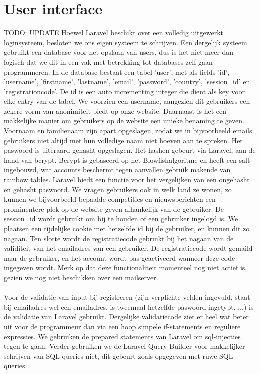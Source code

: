 \documentclass[11pt, a4paper]{article}
\begin{document}
\section{User interface}
TODO: UPDATE
Hoewel Laravel beschikt over een volledig uitgewerkt loginsysteem, besloten we ons eigen systeem te schrijven. Een dergelijk systeem gebruikt een database voor het opslaan van users, dus is het niet meer dan logisch dat we dit in een vak met betrekking tot databases zelf gaan programmeren. In de database bestaat een tabel 'user', met als fields 'id', 'username', 'firstname', 'lastname', 'email', 'password', 'country', 'session\_id' en 'registrationcode'. De id is een auto incrementing integer die dient als key voor elke entry van de tabel. We voorzien een username, aangezien dit gebruikers een zekere vorm van anonimiteit biedt op onze website. Daarnaast is het een makkelijke manier om gebruikers op de website een unieke benaming te geven. Voornaam en familienaam zijn apart opgeslagen, zodat we in bijvoorbeeld emails gebruikers niet altijd met hun volledige naam niet hoeven aan te spreken. Het paswoord is uiteraard gehasht opgeslagen. Het hashen gebeurt via Laravel, aan de hand van bcrypt. Bcrypt is gebaseerd op het Blowfishalgoritme en heeft een salt ingebouwd, wat accounts beschermt tegen aanvallen gebruik makende van rainbow tables. Laravel biedt een functie voor het vergelijken van een ongehasht en gehasht paswoord. We vragen gebruikers ook in welk land ze wonen, zo kunnen we bijvoorbeeld bepaalde competities en nieuwsberichten een prominentere plek op de website geven afhankelijk van de gebruiker. De session\_id wordt gebruikt om bij te houden of een gebruiker ingelogd is. We plaatsen een tijdelijke cookie met hetzelfde id bij de gebruiker, en kunnen dit zo nagaan. Ten slotte wordt de registratiecode gebruikt bij het nagaan van de validiteit van het emailadres van een gebruiker. De registratiecode wordt gemaild naar de gebruiker, en het account wordt pas geactiveerd wanneer deze code ingegeven wordt. Merk op dat deze functionaliteit momenteel nog niet actief is, gezien we nog niet beschikken over een mailserver.
\\
\\
Voor de validatie van input bij registreren (zijn verplichte velden ingevuld, staat bij emailadres wel een emailadres, is tweemaal hetzelfde paswoord ingetypt, ...) is de validatie van Laravel gebruikt. Dergelijke validatiecode ziet er heel wat beter uit voor de programmeur dan via een hoop simpele if-statements en reguliere expressies. We gebruiken de prepared statements van Laravel om sql-injecties tegen te gaan. Verder gebruiken we de Laravel Query Builder voor makkelijker schrijven van SQL queries niet, dit gebeurt zoals opgegeven met ruwe SQL queries.
\end{document}

